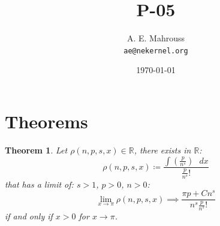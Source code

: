 \documentclass[11pt, a4paper]{article}
\title{P-05}
\author{A. E. Mahrouss\\\texttt{ae@nekernel.org}}
\date{\today}
\theoremstyle{plain}
\newtheorem{theorem}{Theorem}[section]
\theoremstyle{definition}
\theoremstyle{remark}
\begin{document}
\twocolumn[{%
  \maketitle
  \vspace{-0.5em}
  \vspace{0.8em}
  \rule{\linewidth}{0.4pt}
  \vspace{1em}
}]

\maketitle

\section{Theorems}
\begin{theorem}
Let $\rho(n, p, s, x) \in \mathbb{R}$, there exists in $\mathbb{R}$:
\begin{equation}
\rho(n, p, s, x) \coloneq \frac{\int (\frac{p}{n^{s}}) \text{ } dx}{\frac{p}{n^{s}}! }
\end{equation}
that has a limit of: $s>1$, $p>0$, $n>0$:
\begin{equation}
  \lim_{x \to \pi} \rho(n, p, s, x) \implies \frac{\pi p+Cn^s}{n^s\frac{p}{n^s}!}
\end{equation}
if and only if $x > 0$ for $x \to \pi$. 
\end{theorem}
\end{document}
